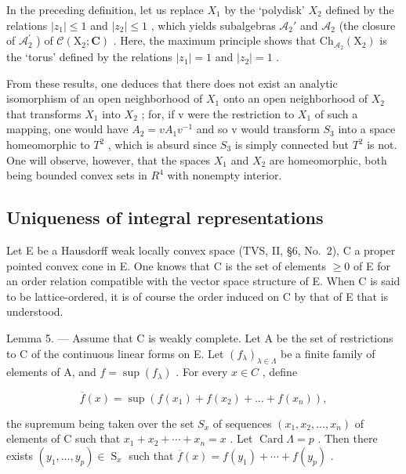 In the preceding definition, let us replace \(X_1\) by the `polydisk' \(X_2\) defined by the relations \(|z_1| \leqslant 1\) and \(|z_2| \leqslant 1\) , which yields subalgebras \(\mathscr{A}_2'\) and \(\mathscr{A}_2\) (the closure of \(\mathcal{A}_2^{\prime}\) ) of \(\mathcal{C}(\mathrm{X}_2; \mathbf{C})\) . Here, the maximum principle shows that \(\mathrm{Ch}_{\mathcal{A}_2}(\mathrm{X}_2)\) is the `torus' defined by the relations \(|z_1| = 1\) and \(|z_2| = 1\) .

From these results, one deduces that there does not exist an analytic isomorphism of an open neighborhood of \(X_{1}\) onto an open neighborhood of \(X_{2}\) that transforms \(X_{1}\) into \(X_{2}\) ; for, if v were the restriction to \(X_{1}\) of such a mapping, one would have \(A_{2}=vA_{1}v^{-1}\) and so v would transform \(S_{3}\) into a space homeomorphic to \(T^{2}\) , which is absurd since \(S_{3}\) is simply connected but \(T^{2}\) is not. One will observe, however, that the spaces \(X_{1}\) and \(X_{2}\) are homeomorphic, both being bounded convex sets in \(R^{4}\) with nonempty interior.

\subsection{Uniqueness of integral representations}

Let E be a Hausdorff weak locally convex space (TVS, II, §6, No.~2), C a proper pointed convex cone in E. One knows that C is the set of elements \(\geqslant0\) of E for an order relation compatible with the vector space structure of E. When C is said to be lattice-ordered, it is of course the order induced on C by that of E that is understood.

Lemma 5. --- Assume that C is weakly complete. Let A be the set of restrictions to C of the continuous linear forms on E. Let \((f_{\lambda})_{\lambda \in \Lambda}\) be a finite family of elements of A, and \(f = \sup(f_{\lambda})\) . For every \(x \in C\) , define

\[
\overline {{{f}}} (x) = \sup \left(f (x _ {1}) + f (x _ {2}) + \dots + f (x _ {n})\right),
\]

the supremum being taken over the set \(S_{x}\) of sequences \((x_{1}, x_{2}, \ldots, x_{n})\) of elements of C such that \(x_{1} + x_{2} + \cdots + x_{n} = x\) . Let \(\operatorname{Card}\Lambda = p\) . Then there exists \((y_{1}, \ldots, y_{p}) \in \operatorname{S}_{x}\) such that \(\overline{f}(x) = f(y_{1}) + \cdots + f(y_{p})\) .


